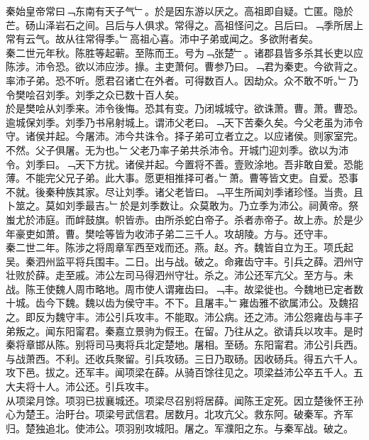 \documentclass{zhvt-classic}
\begin{document}
\hspace*{2em}秦始皇帝常曰﹁东南有天子气﹂。於是因东游以厌之。高祖即自疑。亡匿。隐於芒。砀山泽岩石之间。吕后与人俱求。常得之。高祖怪问之。吕后曰。﹁季所居上常有云气。故从往常得季。﹂高祖心喜。沛中子弟或闻之。多欲附者矣。\\
\hspace*{2em}秦二世元年秋。陈胜等起蕲。至陈而王。号为﹁张楚﹂。诸郡县皆多杀其长吏以应陈涉。沛令恐。欲以沛应涉。掾。主吏萧何。曹参乃曰。﹁君为秦吏。今欲背之。率沛子弟。恐不听。愿君召诸亡在外者。可得数百人。因劫众。众不敢不听。﹂乃令樊哙召刘季。刘季之众已数十百人矣。\\
\hspace*{2em}於是樊哙从刘季来。沛令後悔。恐其有变。乃闭城城守。欲诛萧。曹。萧。曹恐。逾城保刘季。刘季乃书帛射城上。谓沛父老曰。﹁天下苦秦久矣。今父老虽为沛令守。诸侯并起。今屠沛。沛今共诛令。择子弟可立者立之。以应诸侯。则家室完。不然。父子俱屠。无为也。﹂父老乃率子弟共杀沛令。开城门迎刘季。欲以为沛令。刘季曰。﹁天下方扰。诸侯并起。今置将不善。壹败涂地。吾非敢自爱。恐能薄。不能完父兄子弟。此大事。愿更相推择可者。﹂萧。曹等皆文吏。自爱。恐事不就。後秦种族其家。尽让刘季。诸父老皆曰。﹁平生所闻刘季诸珍怪。当贵。且卜筮之。莫如刘季最吉。﹂於是刘季数让。众莫敢为。乃立季为沛公。祠黄帝。祭蚩尤於沛庭。而衅鼓旗。帜皆赤。由所杀蛇白帝子。杀者赤帝子。故上赤。於是少年豪吏如萧。曹。樊哙等皆为收沛子弟二三千人。攻胡陵。方与。还守丰。\\
\hspace*{2em}秦二世二年。陈涉之将周章军西至戏而还。燕。赵。齐。魏皆自立为王。项氏起吴。秦泗州监平将兵围丰。二日。出与战。破之。命雍齿守丰。引兵之薛。泗州守壮败於薛。走至戚。沛公左司马得泗州守壮。杀之。沛公还军亢父。至方与。未战。陈王使魏人周巿略地。周巿使人谓雍齿曰。﹁丰。故梁徙也。今魏地已定者数十城。齿今下魏。魏以齿为侯守丰。不下。且屠丰。﹂雍齿雅不欲属沛公。及魏招之。即反为魏守丰。沛公引兵攻丰。不能取。沛公病。还之沛。沛公怨雍齿与丰子弟叛之。闻东阳甯君。秦嘉立景驹为假王。在留。乃往从之。欲请兵以攻丰。是时秦将章邯从陈。别将司马夷将兵北定楚地。屠相。至砀。东阳甯君。沛公引兵西。与战萧西。不利。还收兵聚留。引兵攻砀。三日乃取砀。因收砀兵。得五六千人。攻下邑。拔之。还军丰。闻项梁在薛。从骑百馀往见之。项梁益沛公卒五千人。五大夫将十人。沛公还。引兵攻丰。\\
\hspace*{2em}从项梁月馀。项羽已拔襄城还。项梁尽召别将居薛。闻陈王定死。因立楚後怀王孙心为楚王。治盱台。项梁号武信君。居数月。北攻亢父。救东阿。破秦军。齐军归。楚独追北。使沛公。项羽别攻城阳。屠之。军濮阳之东。与秦军战。破之。\\
\end{document}
